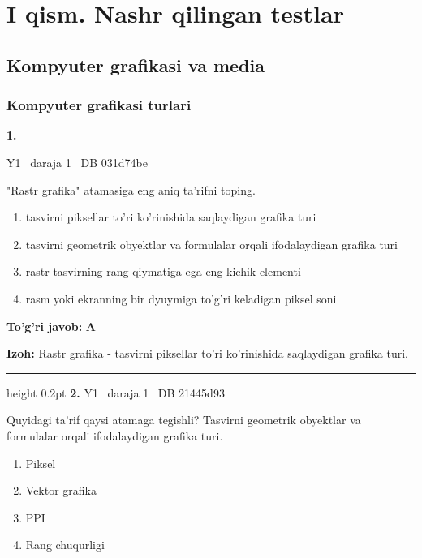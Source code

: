 \documentclass[10pt,a4paper,oneside]{article}
\begin{document}
\section{I qism. Nashr qilingan testlar}
\subsection{Kompyuter grafikasi va media}
\subsubsection{Kompyuter grafikasi turlari}
\hypertarget{q1}{\textbf{\color{ink}1.}}  {\color{muted}\scriptsize Y1 \textbullet\ daraja 1 \textbullet\ DB 031d74be}
\par
"Rastr grafika" atamasiga eng aniq ta'rifni toping.
\begin{enumerate}[label=\Alph*),leftmargin=9mm]
\item tasvirni piksellar to'ri ko'rinishida saqlaydigan grafika turi
\item tasvirni geometrik obyektlar va formulalar orqali ifodalaydigan grafika turi
\item rastr tasvirning rang qiymatiga ega eng kichik elementi
\item rasm yoki ekranning bir dyuymiga to'g'ri keladigan piksel soni
\end{enumerate}
\begin{tcolorbox}[enhanced,breakable,colback=teal!4,colframe=teal!45!black,boxrule=0.45pt,arc=1.2mm,left=2.8mm,right=2.8mm,top=2mm,bottom=2mm,before skip=2mm,after skip=2mm]
\textbf{\color{teal}To'g'ri javob:} \textbf{A}
\par\smallskip
\textbf{Izoh:} Rastr grafika - tasvirni piksellar to'ri ko'rinishida saqlaydigan grafika turi.
\end{tcolorbox}
\vspace{2mm}\hrule height 0.2pt \vspace{4mm}
\hypertarget{q2}{\textbf{\color{ink}2.}}  {\color{muted}\scriptsize Y1 \textbullet\ daraja 1 \textbullet\ DB 21445d93}
\par
Quyidagi ta'rif qaysi atamaga tegishli? Tasvirni geometrik obyektlar va formulalar orqali ifodalaydigan grafika turi.
\begin{enumerate}[label=\Alph*),leftmargin=9mm]
\item Piksel
\item Vektor grafika
\item PPI
\item Rang chuqurligi
\end{enumerate}
\end{document}
